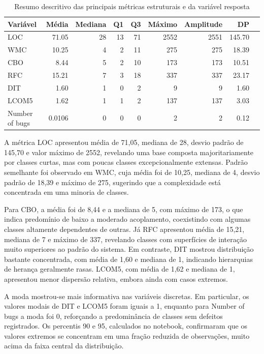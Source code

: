 \documentclass[12pt]{article}
\begin{document}
\begin{table}[H]
\centering
\caption{Resumo descritivo das principais métricas estruturais e da variável resposta}
\label{tab:desc}
\small
\begin{tabular}{lrrrrrrrr}
\toprule
Variável & Média & Mediana & Q1 & Q3 & Máximo & Amplitude & DP \\
\midrule
LOC & 71.05 & 28 & 13 & 71 & 2552 & 2551 & 145.70 \\
WMC & 10.25 & 4 & 2 & 11 & 275 & 275 & 18.39 \\
CBO & 8.44 & 5 & 2 & 10 & 173 & 173 & 10.51 \\
RFC & 15.21 & 7 & 3 & 18 & 337 & 337 & 23.17 \\
DIT & 1.60 & 1 & 0 & 2 & 9 & 9 & 1.60 \\
LCOM5 & 1.62 & 1 & 1 & 2 & 137 & 137 & 3.03 \\
Number of bugs & 0.0106 & 0 & 0 & 0 & 2 & 2 & 0.12 \\
\bottomrule
\end{tabular}
\end{table}

A métrica LOC apresentou média de 71{,}05, mediana de 28, desvio padrão de 145{,}70 e valor máximo de 2552, revelando uma base composta majoritariamente por classes curtas, mas com poucas classes excepcionalmente extensas. Padrão semelhante foi observado em WMC, cuja média foi de 10{,}25, mediana de 4, desvio padrão de 18{,}39 e máximo de 275, sugerindo que a complexidade está concentrada em uma minoria de classes.

Para CBO, a média foi de 8{,}44 e a mediana de 5, com máximo de 173, o que indica predomínio de baixo a moderado acoplamento, coexistindo com algumas classes altamente dependentes de outras. Já RFC apresentou média de 15{,}21, mediana de 7 e máximo de 337, revelando classes com superfícies de interação muito superiores ao padrão do sistema. Em contraste, DIT mostrou distribuição bastante concentrada, com média de 1{,}60 e mediana de 1, indicando hierarquias de herança geralmente rasas. LCOM5, com média de 1{,}62 e mediana de 1, apresentou menor dispersão relativa, embora ainda com casos extremos.

A moda mostrou-se mais informativa nas variáveis discretas. Em particular, os valores modais de DIT e LCOM5 foram iguais a 1, enquanto para Number of bugs a moda foi 0, reforçando a predominância de classes sem defeitos registrados. Os percentis 90 e 95, calculados no notebook, confirmaram que os valores extremos se concentram em uma fração reduzida de observações, muito acima da faixa central da distribuição.
\end{document}
